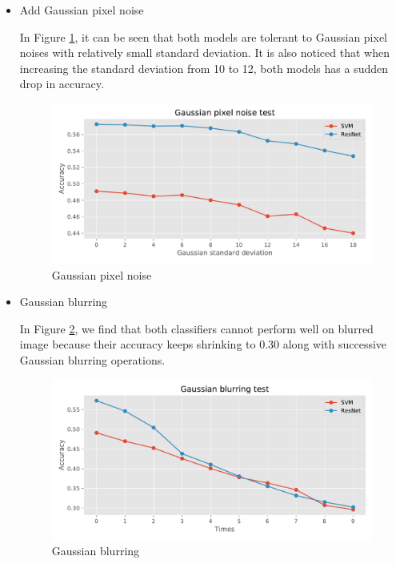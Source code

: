 \documentclass{article}
\begin{document}
\begin{itemize}
    \item Add Gaussian pixel noise
    
    In Figure \ref{fig:gpn}, it can be seen that both models are tolerant to Gaussian pixel noises with relatively small standard deviation. It is also noticed that when increasing the standard deviation from 10 to 12, both models has a sudden drop in accuracy. 
    
    \begin{figure}[H]
    \centering
    \includegraphics[width=\columnwidth]{figures/Gaussian_pixel_noise.pdf}
    \caption{Gaussian pixel noise}
    \label{fig:gpn}
    \end{figure}
    
    
    \item Gaussian blurring
    
    In Figure \ref{fig:gb}, we find that both classifiers cannot perform well on blurred image because their accuracy keeps shrinking to 0.30 along with successive Gaussian blurring operations.
    
    \begin{figure}[H]
    \centering
    \includegraphics[width=\columnwidth]{figures/Gaussian_blurring.pdf}
    \caption{Gaussian blurring}
    \label{fig:gb}
    \end{figure}
    


\end{itemize}
\end{document}
